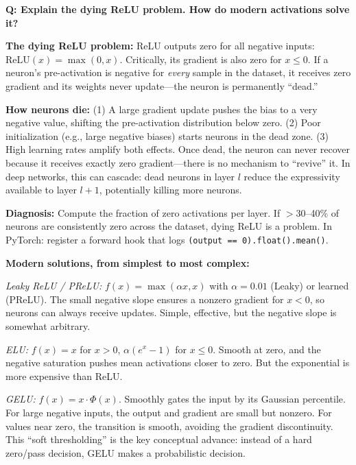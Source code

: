 \begin{interviewq}
\textbf{Q: Explain the dying ReLU problem. How do modern activations solve it?}

 \quad {} \quad \badgefreq{\freqhigh}

\stronganswer

\textbf{The dying ReLU problem:} ReLU outputs zero for all negative inputs: $\text{ReLU}(x) = \max(0,x)$. Critically, its gradient is also zero for $x \leq 0$. If a neuron's pre-activation is negative for \textit{every} sample in the dataset, it receives zero gradient and its weights never update---the neuron is permanently ``dead.''

\textbf{How neurons die:} (1) A large gradient update pushes the bias to a very negative value, shifting the pre-activation distribution below zero. (2) Poor initialization (e.g., large negative biases) starts neurons in the dead zone. (3) High learning rates amplify both effects. Once dead, the neuron can never recover because it receives exactly zero gradient---there is no mechanism to ``revive'' it. In deep networks, this can cascade: dead neurons in layer $l$ reduce the expressivity available to layer $l+1$, potentially killing more neurons.

\textbf{Diagnosis:} Compute the fraction of zero activations per layer. If $>$30--40\% of neurons are consistently zero across the dataset, dying ReLU is a problem. In PyTorch: register a forward hook that logs \texttt{(output == 0).float().mean()}.

\textbf{Modern solutions, from simplest to most complex:}

\textit{Leaky ReLU / PReLU:} $f(x) = \max(\alpha x, x)$ with $\alpha = 0.01$ (Leaky) or learned (PReLU). The small negative slope ensures a nonzero gradient for $x < 0$, so neurons can always receive updates. Simple, effective, but the negative slope is somewhat arbitrary.

\textit{ELU:} $f(x) = x$ for $x > 0$, $\alpha(e^x - 1)$ for $x \leq 0$. Smooth at zero, and the negative saturation pushes mean activations closer to zero. But the exponential is more expensive than ReLU.

\textit{GELU:} $f(x) = x \cdot \Phi(x)$. Smoothly gates the input by its Gaussian percentile. For large negative inputs, the output and gradient are small but nonzero. For values near zero, the transition is smooth, avoiding the gradient discontinuity. This ``soft thresholding'' is the key conceptual advance: instead of a hard zero/pass decision, GELU makes a probabilistic decision.


\end{interviewq}
